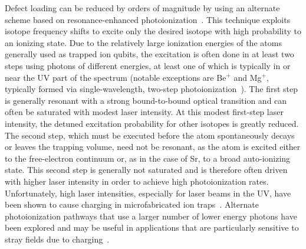 \documentclass[%
12pt,
 amsmath,amssymb,
]{revtex4-2}
\begin{document}
Defect loading can be reduced by orders of magnitude by using an alternate scheme based on resonance-enhanced photoionization~\cite{kjaergaard2000isotope,GuldePhotoIonize2001}. This technique exploits isotope frequency shifts to excite only the desired isotope with high probability to an ionizing state. Due to the relatively large ionization energies of the atoms generally used as trapped ion qubits, the excitation is often done in at least two steps using photons of different energies, at least one of which is typically in or near the UV part of the spectrum (notable exceptions are Be$^{+}$ and Mg$^{+}$, typically formed via single-wavelength, two-step photoionization~\cite{Wolf2018,kjaergaard2000isotope}). The first step is generally resonant with a strong bound-to-bound optical transition and can often be saturated with modest laser intensity. At this modest first-step laser intensity, the detuned excitation probability for other isotopes is greatly reduced. The second step, which must be executed before the atom spontaneously decays or leaves the trapping volume, need not be resonant, as the atom is excited either to the free-electron continuum or, as in the case of Sr, to a broad auto-ionizing state. This second step is generally not saturated and is therefore often driven with higher laser intensity in order to achieve high photoionization rates. Unfortunately, high laser intensities, especially for laser beams in the UV, have been shown to cause charging in microfabricated ion traps~\cite{harlander2010trapped,wang2011laser}.  Alternate photoionization pathways that use a larger number of lower energy photons have been explored and may be useful in applications that are particularly sensitive to stray fields due to charging~\cite{zhang2017realizing}.
\end{document}

